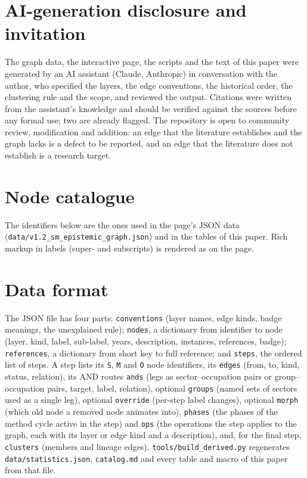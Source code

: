 \documentclass[11pt,a4paper]{article}
\begin{document}
\section{AI-generation disclosure and invitation}\label{sec:ai}
The graph data, the interactive page, the scripts and the text of this paper were generated by an AI assistant (Claude, Anthropic) in conversation with the author, who specified the layers, the edge conventions, the historical order, the clustering rule and the scope, and reviewed the output. Citations were written from the assistant's knowledge and should be verified against the sources before any formal use; two are already flagged. The repository is open to community review, modification and addition: an edge that the literature establishes and the graph lacks is a defect to be reported, and an edge that the literature does not establish is a research target.

\appendix
\section{Node catalogue}\label{app:catalog}
The identifiers below are the ones used in the page's JSON data (\texttt{data/v1.2\_sm\_epistemic\_graph.json}) and in the tables of this paper. Rich markup in labels (super- and subscripts) is rendered as on the page.




\section{Data format}\label{app:data}
The JSON file has four parts: \texttt{conventions} (layer names, edge kinds, badge meanings, the unexplained rule); \texttt{nodes}, a dictionary from identifier to node (layer, kind, label, sub-label, years, description, instances, references, badge); \texttt{references}, a dictionary from short key to full reference; and \texttt{steps}, the ordered list of steps. A step lists its \texttt{S}, \texttt{M} and \texttt{O} node identifiers, its \texttt{edges} (from, to, kind, status, relation), its AND routes \texttt{ands} (legs as sector--occupation pairs or group--occupation pairs, target, label, relation), optional \texttt{groups} (named sets of sectors used as a single leg), optional \texttt{override} (per-step label changes), optional \texttt{morph} (which old node a removed node animates into), \texttt{phases} (the phases of the method cycle active in the step) and \texttt{ops} (the operations the step applies to the graph, each with its layer or edge kind and a description), and, for the final step, \texttt{clusters} (members and lineage edges). \texttt{tools/build\_derived.py} regenerates \texttt{data/statistics.json}, \texttt{catalog.md} and every table and macro of this paper from that file.


\end{document}

